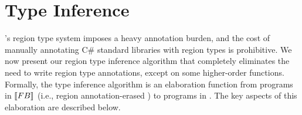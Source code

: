 \section{Type Inference}
\label{sec:type-inference}

\name's region type system imposes a heavy annotation burden, and the
cost of manually annotating C\# standard libraries with region types
is prohibitive. We now present our region type inference algorithm
that completely eliminates the need to write region type annotations,
except on some higher-order functions. Formally, the type inference
algorithm is an elaboration function from programs in $\llbracket {\sc FB} \rrbracket$
(i.e., region annotation-erased \FB) to programs in \FB. The key
aspects of this elaboration are described below.

%

